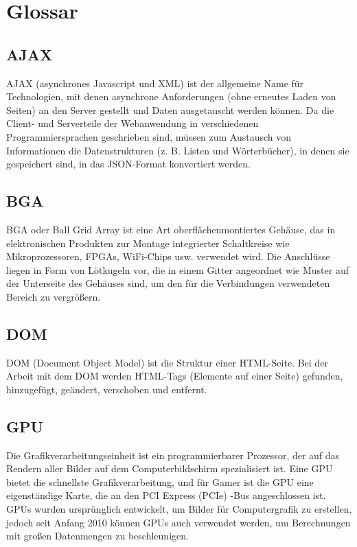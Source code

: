 \chapter*{Glossar}
%
\section*{AJAX}
\label{sec:appendix:ajax}
AJAX (asynchrones Javascript und XML) ist der allgemeine Name für Technologien, mit denen asynchrone Anforderungen (ohne erneutes Laden von Seiten) an den Server gestellt und Daten ausgetauscht werden können. Da die Client- und Serverteile der Webanwendung in verschiedenen Programmiersprachen geschrieben sind, müssen zum Austausch von Informationen die Datenstrukturen (z. B. Listen und Wörterbücher), in denen sie gespeichert sind, in das JSON-Format konvertiert werden.

\section*{BGA}
\label{sec:appendix:bga}
BGA oder Ball Grid Array ist eine Art oberflächenmontiertes Gehäuse, das in elektronischen Produkten zur Montage integrierter Schaltkreise wie Mikroprozessoren, FPGAs, WiFi-Chips usw. verwendet wird. Die Anschlüsse liegen in Form von Lötkugeln vor, die in einem Gitter angeordnet wie Muster auf der Unterseite des Gehäuses sind, um den für die Verbindungen verwendeten Bereich zu vergrößern.

\section*{DOM}
\label{sec:appendix:dom}
DOM (Document Object Model) ist die Struktur einer HTML-Seite. Bei der Arbeit mit dem DOM werden HTML-Tags (Elemente auf einer Seite) gefunden, hinzugefügt, geändert, verschoben und entfernt.

\section*{GPU}
\label{sec:appendix:gpu}
Die Grafikverarbeitungseinheit ist ein programmierbarer Prozessor, der auf das Rendern aller Bilder auf dem Computerbildschirm spezialisiert ist. Eine GPU bietet die schnellste Grafikverarbeitung, und für Gamer ist die GPU eine eigenständige Karte, die an den PCI Express (PCIe) -Bus angeschlossen ist. GPUs wurden ursprünglich entwickelt, um Bilder für Computergrafik zu erstellen, jedoch seit Anfang 2010 können GPUs auch verwendet werden, um Berechnungen mit großen Datenmengen zu beschleunigen.


